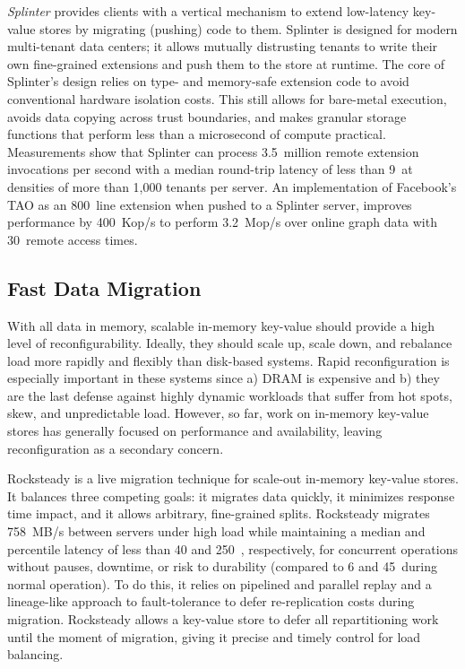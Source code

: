 \textsl{Splinter} provides clients with a vertical mechanism
to extend low-latency key-value stores by migrating (pushing) code to them.
%
Splinter is designed for
modern multi-tenant data centers; it allows mutually distrusting tenants to write
their own fine-grained extensions and push
them to the store at runtime.
%
The core of
Splinter's design relies on type- and memory-safe
extension code to avoid conventional hardware isolation costs.
%
This
still allows for bare-metal execution, avoids data copying across trust
boundaries, and makes granular storage functions that perform less than
a microsecond of compute practical.
%
Measurements show that
Splinter can process 3.5~million remote extension
invocations per second with a median round-trip latency of less than 9~\us at
densities of more than 1,000 tenants per server.
%
An
implementation of Facebook's TAO as an 800~line extension when
pushed to a Splinter server, improves performance by 400~Kop/s to perform
3.2~Mop/s over online graph data with 30~\us remote access times.

\subsection{Fast Data Migration}

%
With all data in memory, scalable in-memory key-value should provide a high
level of reconfigurability.
%
Ideally, they should scale up, scale down,
and rebalance load more rapidly and flexibly than disk-based systems.
%
Rapid reconfiguration is especially important in these systems since a) DRAM is
expensive and b) they are the last defense against highly dynamic
workloads that suffer from hot spots, skew, and unpredictable load.
%
However, so far, work on in-memory key-value stores has generally focused
on performance and availability, leaving reconfiguration as a secondary
concern.

Rocksteady is a live migration technique for scale-out
in-memory key-value stores.
%
It balances three competing goals: it
migrates data quickly, it minimizes response time impact, and it
allows arbitrary, fine-grained splits.
%
Rocksteady migrates 758~MB/s
between servers under high load while maintaining a median and \nnnth
percentile latency of less than 40 and 250~\us, respectively, for concurrent operations
  without pauses, downtime, or risk to durability
(compared to 6 and
45~\us during normal operation).
%
To do this, it 
relies on pipelined and parallel replay and a lineage-like approach to
fault-tolerance to defer re-replication costs during migration.
%
Rocksteady allows a key-value store to defer all repartitioning work
until the moment of migration, giving it precise and timely control for
load balancing.

